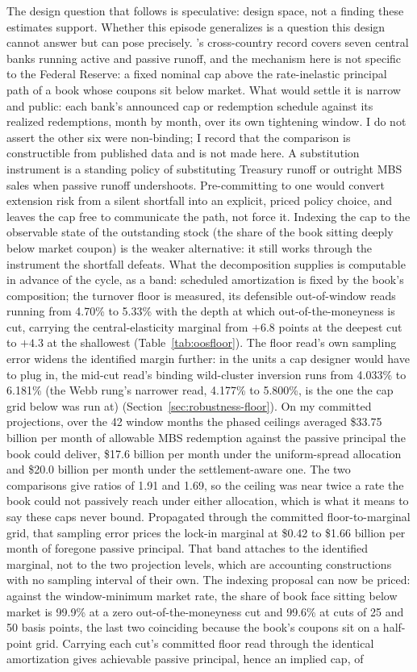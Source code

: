 \documentclass[12pt]{article}
\begin{document}
The design question that follows is speculative: design space, not a finding these estimates support. Whether this episode generalizes is a question this design cannot answer but can pose precisely. \citet{du2024}'s cross-country record covers seven central banks running active and passive runoff, and the mechanism here is not specific to the Federal Reserve: a fixed nominal cap above the rate-inelastic principal path of a book whose coupons sit below market. What would settle it is narrow and public: each bank's announced cap or redemption schedule against its realized redemptions, month by month, over its own tightening window. I do not assert the other six were non-binding; I record that the comparison is constructible from published data and is not made here. A substitution instrument is a standing policy of substituting Treasury runoff or outright MBS sales when passive runoff undershoots. Pre-committing to one would convert extension risk from a silent shortfall into an explicit, priced policy choice, and leaves the cap free to communicate the path, not force it. Indexing the cap to the observable state of the outstanding stock (the share of the book sitting deeply below market coupon) is the weaker alternative: it still works through the instrument the shortfall defeats. What the decomposition supplies is computable in advance of the cycle, as a band: scheduled amortization is fixed by the book's composition; the turnover floor is measured, its defensible out-of-window reads running from 4.70\% to 5.33\% with the depth at which out-of-the-moneyness is cut, carrying the central-elasticity marginal from $+6.8$ points at the deepest cut to $+4.3$ at the shallowest (Table~\ref{tab:oosfloor}). The floor read's own sampling error widens the identified margin further: in the units a cap designer would have to plug in, the mid-cut read's binding wild-cluster inversion runs from 4.033\% to 6.181\% (the Webb rung's narrower read, 4.177\% to 5.800\%, is the one the cap grid below was run at) (Section~\ref{sec:robustness-floor}). On my committed projections, over the 42 window months the phased ceilings averaged \$33.75 billion per month of allowable MBS redemption against the passive principal the book could deliver, \$17.6 billion per month under the uniform-spread allocation and \$20.0 billion per month under the settlement-aware one. The two comparisons give ratios of 1.91 and 1.69, so the ceiling was near twice a rate the book could not passively reach under either allocation, which is what it means to say these caps never bound. Propagated through the committed floor-to-marginal grid, that sampling error prices the lock-in marginal at \$0.42 to \$1.66 billion per month of foregone passive principal. That band attaches to the identified marginal, not to the two projection levels, which are accounting constructions with no sampling interval of their own. The indexing proposal can now be priced: against the window-minimum market rate, the share of book face sitting below market is 99.9\% at a zero out-of-the-moneyness cut and 99.6\% at cuts of 25 and 50 basis points, the last two coinciding because the book's coupons sit on a half-point grid. Carrying each cut's committed floor read through the identical amortization gives achievable passive principal, hence an implied cap, of 
\end{document}
